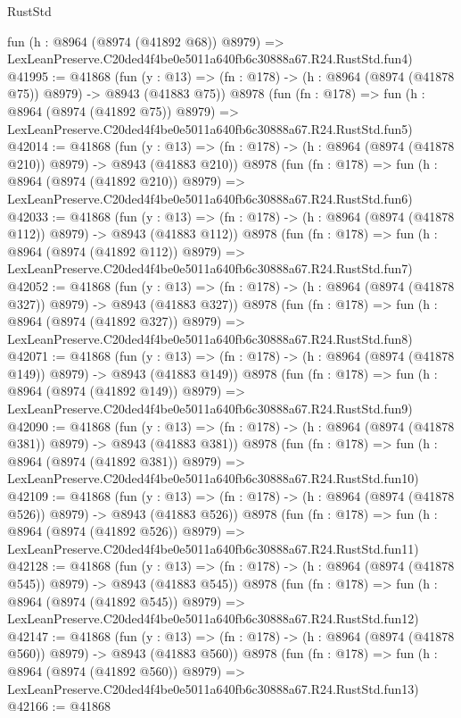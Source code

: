 \begin{lexlean}{RustStd}
\begin{coremodule}
    fun (h : @8964 (@8974 (@41892 @68)) @8979) =>
    LexLeanPreserve.C20ded4f4be0e5011a640fb6c30888a67.R24.RustStd.fun4)
@41995 := @41868
    (fun (y : @13) => (fn : @178) -> (h : @8964 (@8974 (@41878 @75)) @8979) -> @8943 (@41883 @75))
    @8978
    (fun (fn : @178) =>
    fun (h : @8964 (@8974 (@41892 @75)) @8979) =>
    LexLeanPreserve.C20ded4f4be0e5011a640fb6c30888a67.R24.RustStd.fun5)
@42014 := @41868
    (fun (y : @13) => (fn : @178) -> (h : @8964 (@8974 (@41878 @210)) @8979) -> @8943 (@41883 @210))
    @8978
    (fun (fn : @178) =>
    fun (h : @8964 (@8974 (@41892 @210)) @8979) =>
    LexLeanPreserve.C20ded4f4be0e5011a640fb6c30888a67.R24.RustStd.fun6)
@42033 := @41868
    (fun (y : @13) => (fn : @178) -> (h : @8964 (@8974 (@41878 @112)) @8979) -> @8943 (@41883 @112))
    @8978
    (fun (fn : @178) =>
    fun (h : @8964 (@8974 (@41892 @112)) @8979) =>
    LexLeanPreserve.C20ded4f4be0e5011a640fb6c30888a67.R24.RustStd.fun7)
@42052 := @41868
    (fun (y : @13) => (fn : @178) -> (h : @8964 (@8974 (@41878 @327)) @8979) -> @8943 (@41883 @327))
    @8978
    (fun (fn : @178) =>
    fun (h : @8964 (@8974 (@41892 @327)) @8979) =>
    LexLeanPreserve.C20ded4f4be0e5011a640fb6c30888a67.R24.RustStd.fun8)
@42071 := @41868
    (fun (y : @13) => (fn : @178) -> (h : @8964 (@8974 (@41878 @149)) @8979) -> @8943 (@41883 @149))
    @8978
    (fun (fn : @178) =>
    fun (h : @8964 (@8974 (@41892 @149)) @8979) =>
    LexLeanPreserve.C20ded4f4be0e5011a640fb6c30888a67.R24.RustStd.fun9)
@42090 := @41868
    (fun (y : @13) => (fn : @178) -> (h : @8964 (@8974 (@41878 @381)) @8979) -> @8943 (@41883 @381))
    @8978
    (fun (fn : @178) =>
    fun (h : @8964 (@8974 (@41892 @381)) @8979) =>
    LexLeanPreserve.C20ded4f4be0e5011a640fb6c30888a67.R24.RustStd.fun10)
@42109 := @41868
    (fun (y : @13) => (fn : @178) -> (h : @8964 (@8974 (@41878 @526)) @8979) -> @8943 (@41883 @526))
    @8978
    (fun (fn : @178) =>
    fun (h : @8964 (@8974 (@41892 @526)) @8979) =>
    LexLeanPreserve.C20ded4f4be0e5011a640fb6c30888a67.R24.RustStd.fun11)
@42128 := @41868
    (fun (y : @13) => (fn : @178) -> (h : @8964 (@8974 (@41878 @545)) @8979) -> @8943 (@41883 @545))
    @8978
    (fun (fn : @178) =>
    fun (h : @8964 (@8974 (@41892 @545)) @8979) =>
    LexLeanPreserve.C20ded4f4be0e5011a640fb6c30888a67.R24.RustStd.fun12)
@42147 := @41868
    (fun (y : @13) => (fn : @178) -> (h : @8964 (@8974 (@41878 @560)) @8979) -> @8943 (@41883 @560))
    @8978
    (fun (fn : @178) =>
    fun (h : @8964 (@8974 (@41892 @560)) @8979) =>
    LexLeanPreserve.C20ded4f4be0e5011a640fb6c30888a67.R24.RustStd.fun13)
@42166 := @41868

\end{coremodule}
\end{lexlean}
